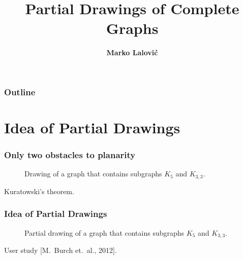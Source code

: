 \documentclass{beamer}
\begin{document}
\title[Partial Drawings of Complete Graphs]{Partial Drawings of Complete Graphs}
\author[Marko Lalović]{\textbf {Marko Lalović}}

\date{} %

\begin{frame}
\titlepage
\end{frame}

\begin{frame}
\frametitle{Outline}
\tableofcontents 
\end{frame}


\section{Idea of Partial Drawings}

\begin{frame}
\frametitle{Only two obstacles to planarity}
\begin{figure}[H]
\centering
\resizebox{8cm}{!}{%

}
\caption{Drawing of a graph that contains subgraphs $K_{5}$ and $K_{3,3}$.}
\end{figure}
\footnotesize{Kuratowski’s theorem.}
\end{frame}

\begin{frame}
\frametitle{Idea of Partial Drawings}
\begin{figure}[H]
\centering
\resizebox{8cm}{!}{%

}
\caption{Partial drawing of a graph that contains subgraphs $K_{5}$ and $K_{3,3}$.}
\end{figure}
\footnotesize{User study [M.\ Burch et.\ al., 2012].}
\end{frame}
\end{document}
